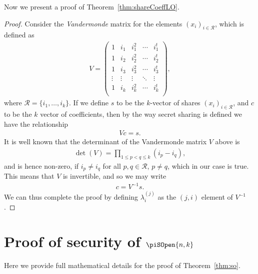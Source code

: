\documentclass{article}
\theoremstyle{remark}
\begin{document}
Now we present a proof of Theorem~\ref{thm:shareCoeffLO}.

\begin{proof}
	Consider the \textit{Vandermonde} matrix for the elements ${(x_i)}_{i \in
	\mathcal{R}}$, which is defined as
	\begin{align*}
		V =
		\begin{pmatrix}
			1 & i_1 & i_1^2 & \cdots & i_1^t\\
			1 & i_2 & i_2^2 & \cdots & i_2^t\\
			1 & i_3 & i_3^2 & \cdots & i_3^t\\
			\vdots & \vdots & \vdots & \ddots & \vdots\\
			1 & i_k & i_k^2 & \cdots & i_k^t\\
		\end{pmatrix},
	\end{align*}
	where $\mathcal{R} = \{i_1, \ldots, i_k\}$. If we define $s$ to be the
	$k$-vector of shares ${(x_i)}_{i \in \mathcal{R}}$, and $c$ to be the $k$
	vector of coefficients, then by the way secret sharing is defined we have
	the relationship
	\begin{align*}
		Vc = s.
	\end{align*}
	It is well known that the determinant of the Vandermonde matrix $V$ above
	is
	\begin{align*}
		\det(V) = \prod_{1 \le p < q \le k} (i_p - i_q),
	\end{align*}
	and is hence non-zero, if $i_p \ne i_q$ for all $p,q \in \mathcal{R}$, $p
	\ne q$, which in our case is true. This means that $V$ is invertible, and
	so we may write
	\begin{align*}
		c = V^{-1}s.
	\end{align*}
	We can thus complete the proof by defining $\lambda_i^{(j)}$ as the $(j,
	i)$ element of $V^{-1}$.
\end{proof}

\section{Proof of security of $\piSOpen{n,k}$}\label{app:so}

Here we provide full mathematical details for the proof of
Theorem~\ref{thm:so}.
\end{document}
